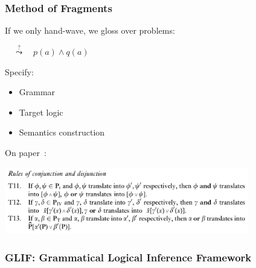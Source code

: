 

\begin{frame}
    \frametitle{Method of Fragments}
    If we only hand-wave, we gloss over problems:

    \hspace{2em}
    $\quad\stackrel{?}{\leadsto}\quad p(a)\wedge q(a)$

    \vspace{1.5em}
    Specify:
    \begin{itemize}
        \item Grammar
        \item Target logic
        \item Semantics construction
    \end{itemize}

    \vspace{1.5em}
    On paper~\cite{Montague:tptoqi73}:

    \vspace{0.3em}\hspace{2em}\includegraphics[trim=0 0 0 80,clip,width=0.8\textwidth]{fig/montague-tptoqioe.png}
\end{frame}

\begin{frame}
    \frametitle{GLIF: Grammatical Logical Inference Framework}
    \centering
    
\end{frame}
